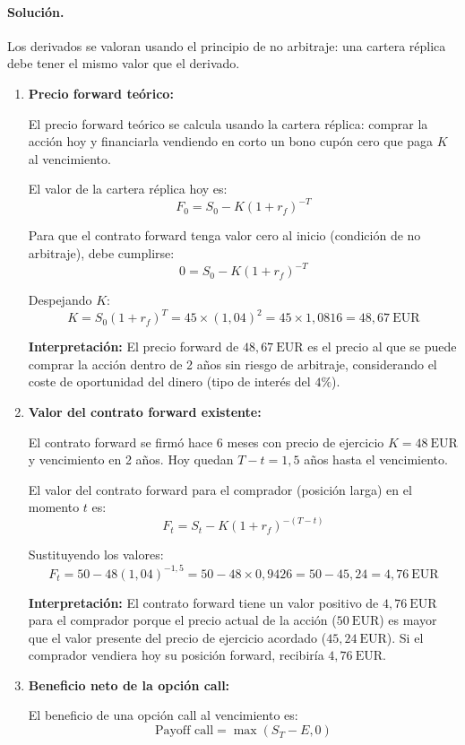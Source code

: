 \documentclass[12pt,a4paper]{article}
\newcommand{\EUR}[1]{\ensuremath{#1~\text{EUR}}}
\newenvironment{solucion}{\paragraph{Solución.}}{}
\begin{document}
\begin{solucion}
Los derivados se valoran usando el principio de no arbitraje: una cartera réplica debe tener el mismo valor que el derivado.
\begin{enumerate}[label=\alph*)]
  \item \textbf{Precio forward teórico:}
  
  El precio forward teórico se calcula usando la cartera réplica: comprar la acción hoy y financiarla vendiendo en corto un bono cupón cero que paga \(K\) al vencimiento.
  
  El valor de la cartera réplica hoy es:
  \[
  F_0 = S_0 - K(1+r_f)^{-T}
  \]
  
  Para que el contrato forward tenga valor cero al inicio (condición de no arbitraje), debe cumplirse:
  \[
  0 = S_0 - K(1+r_f)^{-T}
  \]
  
  Despejando \(K\):
  \[
  K = S_0(1+r_f)^T = 45 \times (1{,}04)^2 = 45 \times 1{,}0816 = \EUR{48{,}67}
  \]
  
  \textbf{Interpretación:} El precio forward de \EUR{48{,}67} es el precio al que se puede comprar la acción dentro de 2 años sin riesgo de arbitraje, considerando el coste de oportunidad del dinero (tipo de interés del \(4\%\)).
  
  \item \textbf{Valor del contrato forward existente:}
  
  El contrato forward se firmó hace 6 meses con precio de ejercicio \(K = \EUR{48}\) y vencimiento en 2 años. Hoy quedan \(T-t = 1{,}5\) años hasta el vencimiento.
  
  El valor del contrato forward para el comprador (posición larga) en el momento \(t\) es:
  \[
  F_t = S_t - K(1+r_f)^{-(T-t)}
  \]
  
  Sustituyendo los valores:
  \[
  F_t = 50 - 48(1{,}04)^{-1{,}5} = 50 - 48 \times 0{,}9426 = 50 - 45{,}24 = \EUR{4{,}76}
  \]
  
  \textbf{Interpretación:} El contrato forward tiene un valor positivo de \EUR{4{,}76} para el comprador porque el precio actual de la acción (\EUR{50}) es mayor que el valor presente del precio de ejercicio acordado (\EUR{45{,}24}). Si el comprador vendiera hoy su posición forward, recibiría \EUR{4{,}76}.
  
  \item \textbf{Beneficio neto de la opción call:}
  
  El beneficio de una opción call al vencimiento es:
  \[
  \text{Payoff call} = \max(S_T - E, 0)
  \]
  

\end{enumerate}
\end{solucion}
\end{document}
